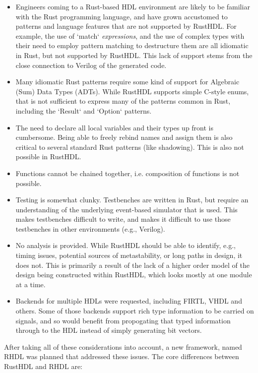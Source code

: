 \documentclass[conference]{IEEEtran}
\begin{document}
\begin{itemize}
  \item Engineers coming to a Rust-based HDL environment are likely to be familiar with the Rust programming language,
  and have grown accustomed to patterns and language features that are not supported by RustHDL.  For example, the 
  use of `match` \emph{expressions}, and the use of complex types with their need to employ pattern matching to destructure 
  them are all idiomatic in Rust, but not supported by RustHDL.  This 
  lack of support stems from the close connection to Verilog of the generated code.
  \item Many idiomatic Rust patterns require some kind of support for Algebraic (Sum) Data Types (ADTs).  While RustHDL
  supports simple C-style enums, that is not sufficient to express many of the patterns common in Rust, including the 
  `Result` and `Option` patterns.
  \item The need to declare all local variables and their types up front is cumbersome.  Being able to freely rebind
  names and assign them is also critical to several standard Rust patterns (like shadowing).  This is also not
  possible in RustHDL.
  \item Functions cannot be chained together, i.e. composition of functions is not possible.
  \item Testing is somewhat clunky.  Testbenches are written in Rust, but require an understanding of the underlying
  event-based simulator that is used.  This makes testbenches difficult to write, and makes it difficult to use those
  testbenches in other environments (e.g., Verilog).
  \item No analysis is provided.  While RustHDL should be able to identify, e.g., timing issues, potential sources of
  metastability, or long paths in design, it does not.  This is primarily a result of the lack of a higher order model
  of the design being constructed within RustHDL, which looks mostly at one module at a time.
  \item Backends for multiple HDLs were requested, including FIRTL, VHDL and others.  Some of those backends support
  rich type information to be carried on signals, and so would benefit from propogating that typed information through
  to the HDL instead of simply generating bit vectors.
\end{itemize}

After taking all of these considerations into account, a new framework, named RHDL was planned that addressed these issues.  The 
core differences between RustHDL and RHDL are:
\end{document}

